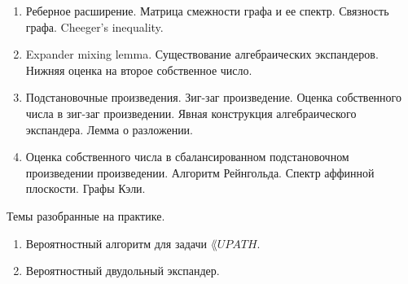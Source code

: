 \begin{enumerate}
    \item Реберное расширение. Матрица смежности графа и ее спектр. Связность графа. Cheeger's inequality.
    \item Expander mixing lemma. Существование алгебраических экспандеров. Нижняя оценка на второе собственное число.
    \item Подстановочные произведения. Зиг-заг произведение. Оценка собственного числа в зиг-заг произведении. Явная
        конструкция алгебраического экспандера. Лемма о разложении. 
    \item Оценка собственного числа в сбалансированном подстановочном произведении произведении. Алгоритм Рейнгольда. Спектр
        аффинной плоскости. Графы Кэли.
\end{enumerate}

\breakline

Темы разобранные на практике.
\begin{enumerate}
    \item Вероятностный алгоритм для задачи $\lang{UPATH}$.
    \item Вероятностный двудольный экспандер.
\end{enumerate}